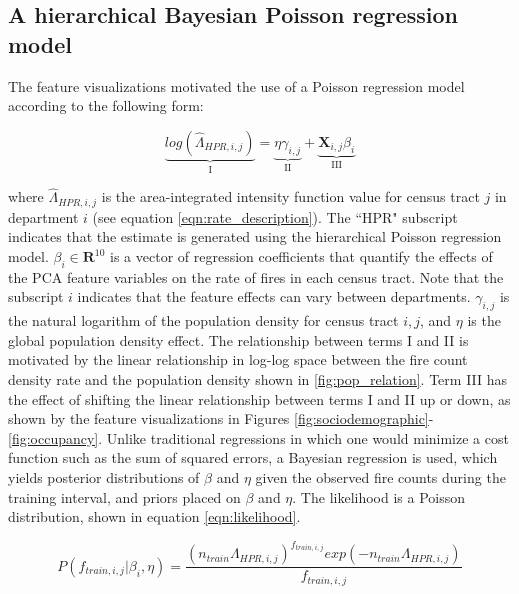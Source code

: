 \documentclass{svjour3}
\begin{document}
  
  
  \clearpage
  
 \subsection{A hierarchical Bayesian Poisson regression model}
 \label{sec:bayes}
 The feature visualizations motivated the use of a Poisson regression model according to the following form:
 
 \begin{equation}
  \label{eqn:poisson_regression}
  \underbrace{log(\hat{\Lambda}_{HPR,i,j})}_{\text{I}} =   \underbrace{\eta\gamma_{i,j}}_{\text{II}} + \underbrace{\textbf{X}_{i,j}\beta_{i}}_{\text{III}}
\end{equation}

\noindent where $\hat{\Lambda}_{HPR,i,j}$ is the area-integrated intensity function value for census tract $j$ in department $i$ (see equation \ref{eqn:rate_description}). The ``HPR" subscript indicates that the estimate is generated using the hierarchical Poisson regression model. $\beta_i \in \textbf{R}^{10}$ is a vector of regression coefficients that quantify the effects of the PCA feature variables on the rate of fires in each census tract. Note that the subscript $i$ indicates that the feature effects can vary between departments. $\gamma_{i,j}$ is the natural logarithm of the population density for census tract $i,j$, and $\eta$ is the global population density effect. The relationship between terms I and II is motivated by the linear relationship in log-log space between the fire count density rate and the population density shown in \ref{fig:pop_relation}. Term III has the effect of shifting the linear relationship between terms I and II up or down, as shown by the feature visualizations in Figures \ref{fig:sociodemographic}-\ref{fig:occupancy}. Unlike traditional regressions in which one would minimize a cost function such as the sum of squared errors, a Bayesian regression is used, which yields posterior distributions of $\beta$ and $\eta$ given the observed fire counts during the training interval, and priors placed on $\beta$ and $\eta$. The likelihood is a Poisson distribution, shown in equation \ref{eqn:likelihood}.

 \begin{equation}
  \label{eqn:likelihood}
  P(f_{train,i,j}|\beta_i, \eta) = \frac{(n_{train}\Lambda_{HPR,i,j})^{f_{train,i,j}} exp(-n_{train}\Lambda_{HPR,i,j})}{f_{train,i,j}}
\end{equation}
\end{document}

